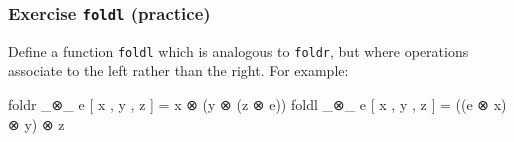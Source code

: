\begin{fence}
\begin{code}
\AgdaSymbol{)}\<%
\\
%
\>[2]\AgdaSpace{}%
\AgdaSpace{}%
\AgdaSpace{}%
\AgdaSpace{}%
\AgdaSpace{}%
\AgdaSpace{}%
\<%
\\
\>[2][@{}l@{\AgdaIndent{0}}]%
\>[4]\AgdaSpace{}%
\AgdaSpace{}%
\AgdaSymbol{(}\AgdaSpace{}%
\AgdaSpace{}%
\AgdaSpace{}%
\AgdaSymbol{)}\AgdaSpace{}%
\<%
\\
%
\>[2]\AgdaSpace{}%
\AgdaSpace{}%
\AgdaSpace{}%
\AgdaSpace{}%
\AgdaSpace{}%
\AgdaSpace{}%
\AgdaSymbol{(}\AgdaSpace{}%
\AgdaSpace{}%
\AgdaSpace{}%
\AgdaSymbol{)}\AgdaSpace{}%
\<%
\\
\>[2][@{}l@{\AgdaIndent{0}}]%
\>[4]\AgdaSpace{}%
\AgdaSpace{}%
\AgdaSpace{}%
\AgdaSpace{}%
\AgdaSpace{}%
\AgdaSpace{}%
\AgdaSpace{}%
\AgdaSpace{}%
\<%
\\
%
\>[2]\<%
\end{code}
\end{fence}

\hypertarget{exercise-foldl-practice}{%
\subsubsection{\texorpdfstring{Exercise \texttt{foldl}
(practice)}{Exercise foldl (practice)}}\label{exercise-foldl-practice}}

Define a function \texttt{foldl} which is analogous to \texttt{foldr},
but where operations associate to the left rather than the right. For
example:

\begin{myDisplay}
foldr _⊗_ e [ x , y , z ]  =  x ⊗ (y ⊗ (z ⊗ e))
foldl _⊗_ e [ x , y , z ]  =  ((e ⊗ x) ⊗ y) ⊗ z
\end{myDisplay}

